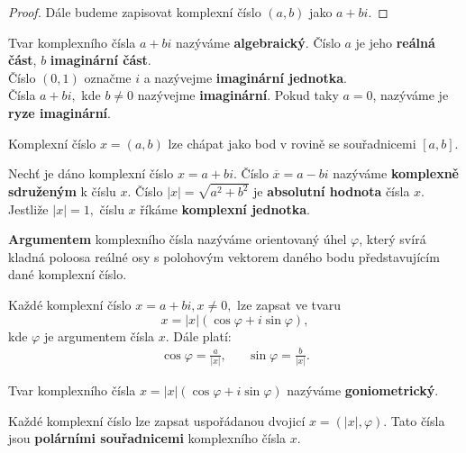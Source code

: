 \begin{proof}
    Dále budeme zapisovat komplexní číslo $(a,b)$ jako $a+bi.$
\end{proof}

\begin{definition}
    Tvar komplexního čísla $a+bi$ nazýváme \textbf{algebraický}. Číslo $a$ je jeho
   \textbf{reálná část}, $b$ \textbf{imaginární část}.\\
  Číslo $(0,1)$ označme $i$ a nazývejme \textbf{imaginární jednotka}. \\
  Čísla $a+bi,$ kde $b\ne 0$ nazývejme \textbf{imaginární}. Pokud taky $a=0$,
  nazýváme je \textbf{ryze imaginární}.
\end{definition}

\begin{pozn}
    Komplexní číslo $x=(a,b)$ lze chápat jako bod v rovině se souřadnicemi $[a,b].$
\end{pozn}

\begin{definition}
    Nechť je dáno komplexní číslo $x= a+bi.$ Číslo $\overline{x}=a-bi$ nazýváme
   \textbf{komplexně sdruženým} k číslu $x$. Číslo $|x|=\sqrt{a^2+b^2}$ je \textbf{
   absolutní hodnota} čísla $x$. Jestliže $|x|=1,$ číslu $x$ říkáme \textbf{komplexní jednotka}.
\end{definition}

\begin{definition}
\textbf{Argumentem} komplexního čísla nazýváme orientovaný úhel $\varphi$, který svírá kladná
poloosa reálné osy s polohovým vektorem daného bodu představujícím dané komplexní číslo.
\end{definition}

\begin{veta}
    Každé komplexní číslo $x=a+bi, x\ne 0,$ lze zapsat ve tvaru
    $$x=|x|(\cos \varphi + i \sin \varphi),$$
    kde $\varphi$ je argumentem čísla $x$. Dále platí:
    \begin{align*}
        \cos \varphi = \frac{a}{|x|}, && \sin \varphi = \frac{b}{|x|}.
    \end{align*}
\end{veta}

\begin{definition}
    Tvar komplexního čísla $x= |x|(\cos \varphi + i\sin\varphi)$ nazýváme \textbf{goniometrický}.
\end{definition}

\begin{pozn}
    Každé komplexní číslo lze zapsat uspořádanou dvojicí $x=(|x|, \varphi).$
    Tato čísla jsou \textbf{polárními souřadnicemi} komplexního čísla $x$.
\end{pozn}

